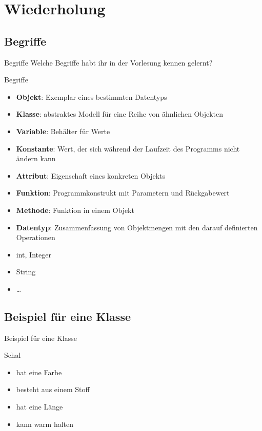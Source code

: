 \documentclass[usepdftitle=false,hyperref={pdfpagelabels=false}]{beamer}
\begin{document}

\section{Wiederholung}
\subsection{Begriffe}
\begin{frame}{Begriffe}
    Welche Begriffe habt ihr in der Vorlesung kennen gelernt?
\end{frame}

\begin{frame}{Begriffe}
    \begin{itemize}
        \item \textbf{Objekt}: Exemplar eines bestimmten Datentyps
        \item \textbf{Klasse}: abstraktes Modell für eine Reihe von ähnlichen Objekten
        \item \textbf{Variable}: Behälter für Werte
        \item \textbf{Konstante}: Wert, der sich während der Laufzeit des Programms nicht ändern kann
        \item \textbf{Attribut}: Eigenschaft eines konkreten Objekts
        \item \textbf{Funktion}: Programmkonstrukt mit Parametern und Rückgabewert
        \item \textbf{Methode}: Funktion in einem Objekt
        \item \textbf{Datentyp}: Zusammenfassung von Objektmengen mit den darauf definierten Operationen
        \item int, Integer
        \item String
        \item \dots
    \end{itemize}
\end{frame}

\subsection{Beispiel für eine Klasse}
\begin{frame}{Beispiel für eine Klasse}
    \begin{block}{Schal}
        \begin{itemize}
            \item hat eine Farbe
            \item besteht aus einem Stoff
            \item hat eine Länge
            \item kann warm halten
        \end{itemize}
    \end{block}
\end{frame}
\end{document}
